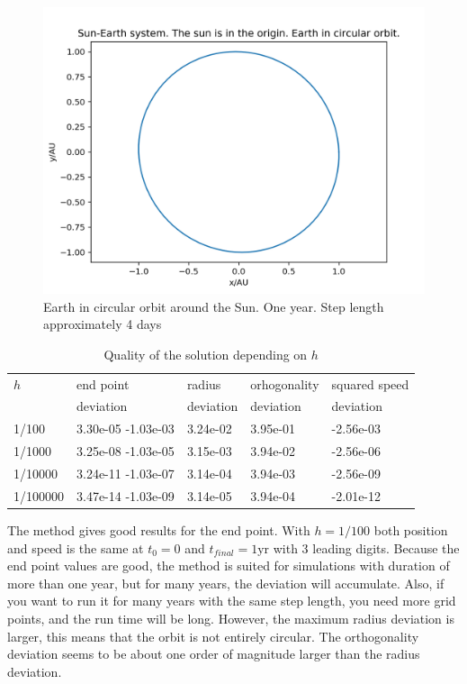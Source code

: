 \documentclass{article}
\begin{document}
\begin{figure}
  \includegraphics[width=\linewidth]{sun_earth.png}
  \caption{Earth in circular orbit around the Sun. One year. Step length approximately 4 days}
  \label{fig:earth-sun}
\end{figure}

\begin{table}[h!]
  \centering
  \caption{Quality of the solution depending on $h$}
  \label{tab:table1}
  \begin{tabular}{l||l|l|l|l|}
   $h$  & end point  & radius   & orhogonality   & squared speed \\ 
        &   deviation &   deviation &   deviation &  deviation\\ 

    \hline
    1/100  & 3.30e-05 -1.03e-03 & 3.24e-02 & 3.95e-01 &  -2.56e-03\\
    \hline
    1/1000 & 3.25e-08 -1.03e-05 & 3.15e-03 & 3.94e-02 & -2.56e-06 \\
    \hline
     1/10000 & 3.24e-11 -1.03e-07 & 3.14e-04 & 3.94e-03 & -2.56e-09
\\
	\hline
	1/100000 & 3.47e-14 -1.03e-09 & 3.14e-05 & 3.94e-04 & -2.01e-12
\\
  \end{tabular}
\end{table}
The method gives good results for the end point. With $h=1/100$ both position and speed is the same at $t_0=0$ and $t_{final} = 1 \textrm{yr}$ with 3 leading digits. Because the end point values are good, the method is suited for simulations with duration of more than one year, but for many years, the deviation will accumulate. Also, if you want to run it for many years with the same step length, you need more grid points, and the run time will be long.  However, the maximum radius deviation is larger, this means that the orbit is not entirely circular. The orthogonality deviation seems to be about one order of magnitude larger than the radius deviation.
\end{document}

